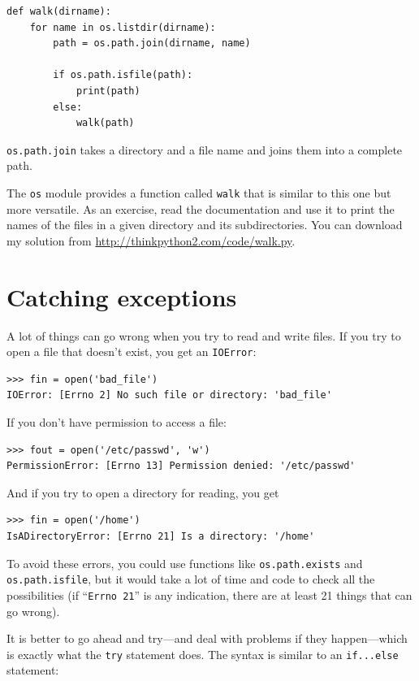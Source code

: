 \documentclass[10pt]{book}
\begin{document}
\begin{verbatim}
def walk(dirname):
    for name in os.listdir(dirname):
        path = os.path.join(dirname, name)

        if os.path.isfile(path):
            print(path)
        else:
            walk(path)
\end{verbatim}
%
{\tt os.path.join} takes a directory and a file name and joins
them into a complete path.

The {\tt os} module provides a function called {\tt walk} that is
similar to this one but more versatile.  As an exercise, read the
documentation and use it to print the names of the files in a given
directory and its subdirectories.  You can download my solution from
\url{http://thinkpython2.com/code/walk.py}.


\section{Catching exceptions}
\label{catch}

A lot of things can go wrong when you try to read and write
files.  If you try to open a file that doesn't exist, you get an
{\tt IOError}:

\begin{verbatim}
>>> fin = open('bad_file')
IOError: [Errno 2] No such file or directory: 'bad_file'
\end{verbatim}
%
If you don't have permission to access a file:

\begin{verbatim}
>>> fout = open('/etc/passwd', 'w')
PermissionError: [Errno 13] Permission denied: '/etc/passwd'
\end{verbatim}
%
And if you try to open a directory for reading, you get

\begin{verbatim}
>>> fin = open('/home')
IsADirectoryError: [Errno 21] Is a directory: '/home'
\end{verbatim}
%
To avoid these errors, you could use functions like {\tt os.path.exists}
and {\tt os.path.isfile}, but it would take a lot of time and code
to check all the possibilities (if ``{\tt Errno 21}'' is any
indication, there are at least 21 things that can go wrong).

It is better to go ahead and try---and deal with problems if they
happen---which is exactly what the {\tt try} statement does.  The
syntax is similar to an {\tt if...else} statement:
\end{document}
